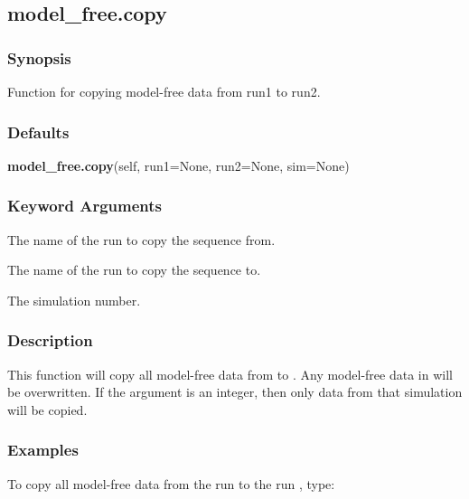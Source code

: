   

 \newpage 

 \subsection{model\_free.copy} 

  
 \subsubsection{Synopsis} 

 Function for copying model-free data from run1 to run2. 
  

  
 \subsubsection{Defaults} 

 \textsf{\textbf{model\_free.copy}(self, run1=None, run2=None, sim=None)} 

  
 \subsubsection{Keyword Arguments} 

   The name of the run to copy the sequence from.   

   The name of the run to copy the sequence to.   

   The simulation number.  

  

  
 \subsubsection{Description} 

 This function will copy all model-free data from  to .  Any model-free data in  will be overwritten.  If the argument  is an integer, then only data from that simulation will be copied. 
  

  
 \subsubsection{Examples} 

 To copy all model-free data from the run  to the run , type: 
  

